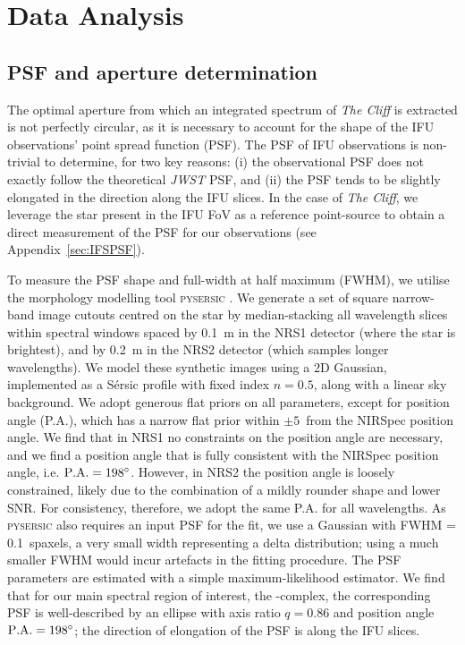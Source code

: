 \documentclass[fleqn,usenatbib]{mnras}
\newcommand{\jwst}{\textit{JWST}\xspace}
\newcommand{\Hbeta}{\text{H\textbeta}\xspace}
\newcommand{\cliff}{\textit{The Cliff}\xspace}
\begin{document}
\section{Data Analysis}\label{sec:Methods}

\subsection{PSF and aperture determination}\label{sec:Size}

The optimal aperture from which an integrated spectrum of \cliff is extracted is not perfectly circular, as it is necessary to account for the shape of the IFU observations' point spread function (PSF). 
The PSF of IFU observations is non-trivial to determine, for two key reasons: (i) the observational PSF does not exactly follow the theoretical \jwst PSF, and
(ii) the PSF tends to be slightly elongated in the direction along the IFU slices. 
In the case of \cliff, we leverage the star present in the IFU FoV as a reference point-source to obtain a direct measurement of the PSF for our observations (see Appendix~\ref{sec:IFSPSF}).

To measure the PSF shape and full-width at half maximum (FWHM), we utilise the morphology modelling tool \textsc{pysersic} \citep{PashaMiller2023}. 
We generate a set of square narrow-band image cutouts centred on the star by median-stacking all wavelength slices within spectral windows spaced by 0.1~\textmu m in the NRS1 detector (where the star is brightest), and by 0.2~\textmu m in the NRS2 detector (which samples longer wavelengths). 
We model these synthetic images using a 2D Gaussian, implemented as a S\'ersic profile with fixed index $n=0.5$, along with a linear sky background. 
We adopt generous flat priors on all parameters, except for position angle (P.A.), which has a narrow flat prior within $\pm 5$\textdegree\ from the NIRSpec position angle.
We find that in NRS1 no constraints on the position angle are necessary, and we find a position angle that is fully consistent with the NIRSpec position angle, i.e. $\mathrm{P.A.} = 198\degree$. 
However, in NRS2 the position angle is loosely constrained, likely due to the combination of a mildly rounder shape and lower SNR.
For consistency, therefore, we adopt the same P.A. for all wavelengths.
As \textsc{pysersic} also requires an input PSF for the fit, we use a Gaussian with FWHM = 0.1~spaxels, a very small width representing a delta distribution; using a much smaller FWHM would incur artefacts in the fitting procedure. 
The PSF parameters are estimated with a simple maximum-likelihood estimator. 
We find that for our main spectral region of interest, the \Hbeta-\OIIIL complex, the corresponding PSF is well-described by an ellipse with axis ratio $q = 0.86$ and position angle $\mathrm{P.A.} = 198\degree$; the direction of elongation of the PSF is along the IFU slices.
\end{document}
